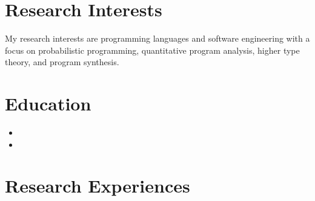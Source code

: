 \documentclass[11pt,letterpaper,roman]{moderncv}        %
\begin{document}
\makecvtitle


\vspace{-3em}

\section{Research Interests}

My research interests are programming languages and software engineering with a focus on probabilistic programming, quantitative program analysis, higher type theory, and program synthesis.

\section{Education}

\begin{itemize}
	\item{}
	
	\vspace{2pt}
	
	\item{}
\end{itemize}

\section{Research Experiences}
\end{document}
